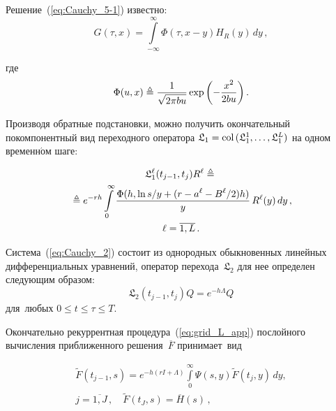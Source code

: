 \begin{multicols}{2}
\begin{enumerate}[1.]
\vspace*{-3pt}

\noindent
Решение~(\ref{eq:Cauchy_5-1}) из\-вестно:
\begin{equation*}
G(\tau,x) =  \int\limits_{-\infty}^{\infty} \Phi (\tau, x-y)H_R(y)\, dy\,,
\end{equation*}

\vspace*{-3pt}

\noindent
где
$$
\Phi (u,x) \triangleq \displaystyle\frac{\displaystyle 1\mathstrut}{\displaystyle \sqrt{2\pi b u}\mathstrut} \exp \left(- \displaystyle\frac{\displaystyle x^2\mathstrut}{\displaystyle 2bu\mathstrut} \right).
$$
\end{enumerate}

\vspace*{-3pt}

\noindent
Производя обратные под\-ста\-нов\-ки, мож\-но получить окончательный покомпонентный вид переходного оператора $\mathfrak{L}_1
\hm= \mathrm{col}\,(\mathfrak{L}_1^1,\ldots,\mathfrak{L}_1^L)$ на одном временн$\acute{\mbox{о}}$м \mbox{шаге}:

\vspace*{-3pt}

\noindent
\begin{multline*}
\mathfrak{L}_1^{\ell}(t_{j-1},t_j) R^{\ell} \triangleq{}\\
{}\triangleq
e^{-rh} \int\limits_0^{\infty}
\displaystyle\frac{\displaystyle \Phi(h, \ln {s}/{y}  +
(r- a^{\ell} - {B^{\ell}}/{2} )h)\mathstrut}{\displaystyle y\mathstrut}\,R^{\ell}(y)\,dy\,, \\
 \ell = \overline{1,L}\,.
\end{multline*}

\vspace*{-3pt}

Система~(\ref{eq:Cauchy_2}) со\-сто\-ит из однородных обыкновенных линейных дифференциальных урав\-не\-ний,
оператор перехода~$\mathfrak{L}_2$ для нее определен сле\-ду\-ющим об\-ра\-зом:
\begin{equation*}
\mathfrak{L}_2(t_{j-1},t_j)Q = e^ {-h \Lambda }Q 
\end{equation*}
\mbox{для любых} $0 \leqslant  t  \leqslant \tau  \leqslant T$.

Окончательно рекуррентная процедура~(\ref{eq:grid_L_app}) послойного вы\-чис\-ле\-ния при\-бли\-жен\-но\-го решения~$\overline{F}$ при\-ни\-ма\-ет~вид

\vspace*{-3pt}

\noindent
\begin{multline}
\widetilde{F}(t_{j-1},s) =
e^{-h(rI+\Lambda)} \int\limits_0^{\infty}\Psi(s,y)
\widetilde{F}(t_j,y)\,dy, \\ 
j=\overline{1,J}\,, \quad \widetilde{F}(t_J,s) = \overline{H}(s)\,,
\label{eq:grid_L_app_expl}
\end{multline}



\end{multicols}
